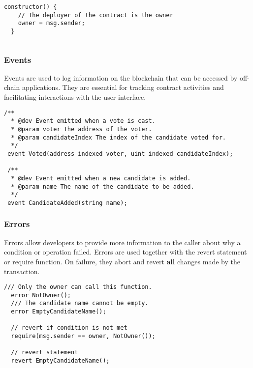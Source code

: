 \documentclass[12pt]{article}
\begin{document}
\begin{lstlisting}[language=Solidity]
  constructor() {
    // The deployer of the contract is the owner
    owner = msg.sender;
  }
\end{lstlisting}

\begin{lstlisting}[language=Solidity]

\end{lstlisting}

\subsubsection*{Events}

Events are used to log information on the blockchain that can be accessed by off-chain applications. They are essential for tracking contract activities and facilitating interactions with the user interface.

\begin{lstlisting}[language=Solidity]
  /**
  * @dev Event emitted when a vote is cast.
  * @param voter The address of the voter.
  * @param candidateIndex The index of the candidate voted for.
  */
 event Voted(address indexed voter, uint indexed candidateIndex);

 /**
  * @dev Event emitted when a new candidate is added.
  * @param name The name of the candidate to be added.
  */
 event CandidateAdded(string name);
\end{lstlisting}

\subsubsection*{Errors}

Errors allow developers to provide more information to the caller about why a condition or operation failed. Errors are used together with the revert statement or require function. On failure, they abort and revert \textbf{all} changes made by the transaction.

\begin{lstlisting}[language=Solidity]
  /// Only the owner can call this function.
  error NotOwner();
  /// The candidate name cannot be empty.
  error EmptyCandidateName();

  // revert if condition is not met
  require(msg.sender == owner, NotOwner());

  // revert statement
  revert EmptyCandidateName();
\end{lstlisting}
\end{document}
